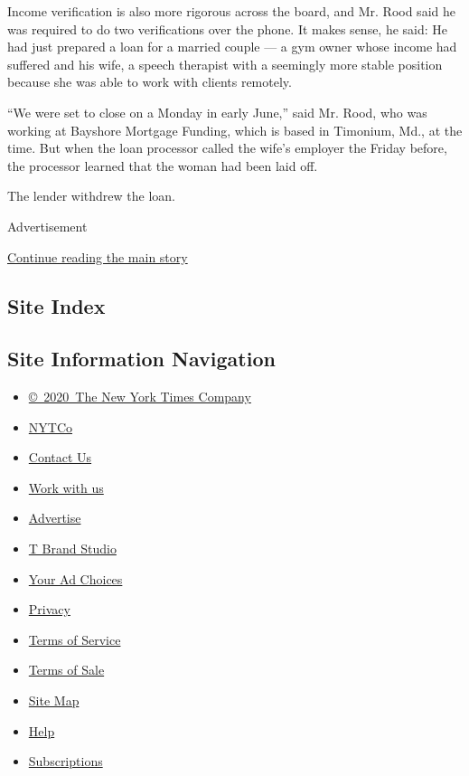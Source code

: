 Income verification is also more rigorous across the board, and Mr. Rood
said he was required to do two verifications over the phone. It makes
sense, he said: He had just prepared a loan for a married couple --- a
gym owner whose income had suffered and his wife, a speech therapist
with a seemingly more stable position because she was able to work with
clients remotely.

``We were set to close on a Monday in early June,'' said Mr. Rood, who
was working at Bayshore Mortgage Funding, which is based in Timonium,
Md., at the time. But when the loan processor called the wife's employer
the Friday before, the processor learned that the woman had been laid
off.

The lender withdrew the loan.

Advertisement

\protect\hyperlink{after-bottom}{Continue reading the main story}

\hypertarget{site-index}{%
\subsection{Site Index}\label{site-index}}

\hypertarget{site-information-navigation}{%
\subsection{Site Information
Navigation}\label{site-information-navigation}}

\begin{itemize}
\tightlist
\item
  \href{https://help.nytimes.com/hc/en-us/articles/115014792127-Copyright-notice}{©~2020~The
  New York Times Company}
\end{itemize}

\begin{itemize}
\tightlist
\item
  \href{https://www.nytco.com/}{NYTCo}
\item
  \href{https://help.nytimes.com/hc/en-us/articles/115015385887-Contact-Us}{Contact
  Us}
\item
  \href{https://www.nytco.com/careers/}{Work with us}
\item
  \href{https://nytmediakit.com/}{Advertise}
\item
  \href{http://www.tbrandstudio.com/}{T Brand Studio}
\item
  \href{https://www.nytimes.com/privacy/cookie-policy\#how-do-i-manage-trackers}{Your
  Ad Choices}
\item
  \href{https://www.nytimes.com/privacy}{Privacy}
\item
  \href{https://help.nytimes.com/hc/en-us/articles/115014893428-Terms-of-service}{Terms
  of Service}
\item
  \href{https://help.nytimes.com/hc/en-us/articles/115014893968-Terms-of-sale}{Terms
  of Sale}
\item
  \href{https://spiderbites.nytimes.com}{Site Map}
\item
  \href{https://help.nytimes.com/hc/en-us}{Help}
\item
  \href{https://www.nytimes.com/subscription?campaignId=37WXW}{Subscriptions}
\end{itemize}
